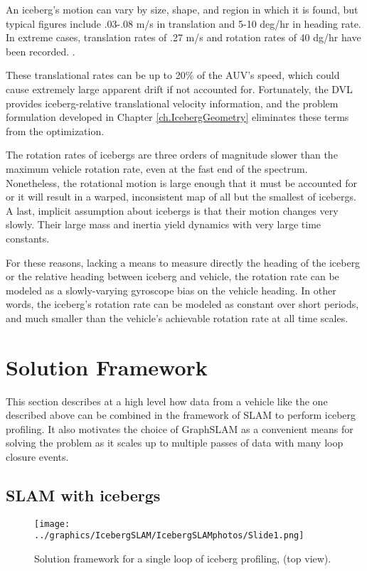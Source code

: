 An iceberg's motion can vary by size, shape, and region in which it is found, but typical figures include .03-.08 m/s in translation  and 5-10 deg/hr in heading rate. In extreme cases, translation rates of .27 m/s and rotation rates of 40 dg/hr have been recorded. \cite{Gladstone2002,Wadhams1983}. 

These translational rates can be up to 20\% of the AUV's speed, which could cause extremely large apparent drift if not accounted for. Fortunately, the DVL provides iceberg-relative translational velocity information, and the problem formulation developed in Chapter \ref{ch.IcebergGeometry} eliminates these terms from the optimization.

The rotation rates of icebergs are three orders of magnitude slower than the maximum vehicle rotation rate, even at the fast end of the spectrum. Nonetheless, the rotational motion is large enough that it must be accounted for or it will result in a warped, inconsistent map of all but the smallest of icebergs. A last, implicit assumption about icebergs is that their motion changes very slowly. Their large mass and inertia yield dynamics with very large time constants. 

For these reasons, lacking a means to measure directly the heading of the iceberg or the relative heading between iceberg and vehicle, the rotation rate can be modeled as a slowly-varying gyroscope bias on the vehicle heading. In other words, the iceberg's rotation rate can be modeled as constant over short periods, and much smaller than the vehicle's achievable rotation rate at all time scales.

\section{Solution Framework}

This section describes at a high level how data from a vehicle like the one described above can be combined in the framework of SLAM to perform iceberg profiling. It also motivates the choice of GraphSLAM as a convenient means for solving the problem as it scales up to multiple passes of data with many loop closure events.

\subsection{SLAM with icebergs}

\begin{figure}[htb]
   \centering
   \texttt{[image: ../graphics/IcebergSLAM/IcebergSLAMphotos/Slide1.png]} %
   \caption{Solution framework for a single loop of iceberg profiling, (top view). }
   \label{fig:icebergSLAM}
\end{figure}

